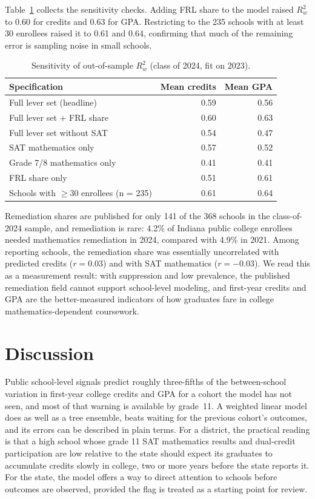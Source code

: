 \documentclass[11pt]{article}
\newcommand{\subsec}[1]{\par\vspace{1.6ex}\noindent{\large\bfseries #1}\par\vspace{0.8ex}\noindent\ignorespaces}
\begin{document}
\subsec{Sensitivity analyses}
Table~\ref{tab:sens} collects the sensitivity checks. Adding FRL share to the model raised $R^2_w$ to 0.60 for credits and 0.63 for GPA. Restricting to the 235 schools with at least 30 enrollees raised it to 0.61 and 0.64, confirming that much of the remaining error is sampling noise in small schools.

\begin{table}[t]
\centering
\caption{Sensitivity of out-of-sample $R^2_w$ (class of 2024, fit on 2023).}\label{tab:sens}
\small
\begin{tabular}{@{}lrr@{}}
\toprule
Specification & Mean credits & Mean GPA \\
\midrule
Full lever set (headline) & 0.59 & 0.56 \\
Full lever set + FRL share & 0.60 & 0.63 \\
Full lever set without SAT & 0.54 & 0.47 \\
SAT mathematics only & 0.57 & 0.52 \\
Grade 7/8 mathematics only & 0.41 & 0.41 \\
FRL share only & 0.51 & 0.61 \\
Schools with $\ge$30 enrollees (n = 235) & 0.61 & 0.64 \\
\bottomrule
\end{tabular}
\end{table}

\subsec{Mathematics remediation}
Remediation shares are published for only 141 of the 368 schools in the class-of-2024 sample, and remediation is rare: 4.2\% of Indiana public college enrollees needed mathematics remediation in 2024, compared with 4.9\% in 2021. Among reporting schools, the remediation share was essentially uncorrelated with predicted credits ($r = 0.03$) and with SAT mathematics ($r = -0.03$). We read this as a measurement result: with suppression and low prevalence, the published remediation field cannot support school-level modeling, and first-year credits and GPA are the better-measured indicators of how graduates fare in college mathematics-dependent coursework.

\section{Discussion}\label{sec:discussion}

Public school-level signals predict roughly three-fifths of the between-school variation in first-year college credits and GPA for a cohort the model has not seen, and most of that warning is available by grade~11. A weighted linear model does as well as a tree ensemble, beats waiting for the previous cohort's outcomes, and its errors can be described in plain terms. For a district, the practical reading is that a high school whose grade 11 SAT mathematics results and dual-credit participation are low relative to the state should expect its graduates to accumulate credits slowly in college, two or more years before the state reports it. For the state, the model offers a way to direct attention to schools before outcomes are observed, provided the flag is treated as a starting point for review.
\end{document}
